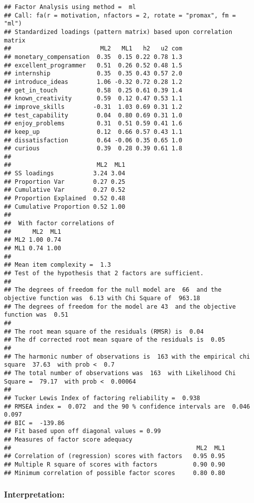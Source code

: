 \documentclass[
]{article}
\begin{document}
\begin{verbatim}
## Factor Analysis using method =  ml
## Call: fa(r = motivation, nfactors = 2, rotate = "promax", fm = "ml")
## Standardized loadings (pattern matrix) based upon correlation matrix
##                         ML2   ML1   h2   u2 com
## monetary_compensation  0.35  0.15 0.22 0.78 1.3
## excellent_programmer   0.51  0.26 0.52 0.48 1.5
## internship             0.35  0.35 0.43 0.57 2.0
## introduce_ideas        1.06 -0.32 0.72 0.28 1.2
## get_in_touch           0.58  0.25 0.61 0.39 1.4
## known_creativity       0.59  0.12 0.47 0.53 1.1
## improve_skills        -0.31  1.03 0.69 0.31 1.2
## test_capability        0.04  0.80 0.69 0.31 1.0
## enjoy_problems         0.31  0.51 0.59 0.41 1.6
## keep_up                0.12  0.66 0.57 0.43 1.1
## dissatisfaction        0.64 -0.06 0.35 0.65 1.0
## curious                0.39  0.28 0.39 0.61 1.8
## 
##                        ML2  ML1
## SS loadings           3.24 3.04
## Proportion Var        0.27 0.25
## Cumulative Var        0.27 0.52
## Proportion Explained  0.52 0.48
## Cumulative Proportion 0.52 1.00
## 
##  With factor correlations of 
##      ML2  ML1
## ML2 1.00 0.74
## ML1 0.74 1.00
## 
## Mean item complexity =  1.3
## Test of the hypothesis that 2 factors are sufficient.
## 
## The degrees of freedom for the null model are  66  and the objective function was  6.13 with Chi Square of  963.18
## The degrees of freedom for the model are 43  and the objective function was  0.51 
## 
## The root mean square of the residuals (RMSR) is  0.04 
## The df corrected root mean square of the residuals is  0.05 
## 
## The harmonic number of observations is  163 with the empirical chi square  37.63  with prob <  0.7 
## The total number of observations was  163  with Likelihood Chi Square =  79.17  with prob <  0.00064 
## 
## Tucker Lewis Index of factoring reliability =  0.938
## RMSEA index =  0.072  and the 90 % confidence intervals are  0.046 0.097
## BIC =  -139.86
## Fit based upon off diagonal values = 0.99
## Measures of factor score adequacy             
##                                                    ML2  ML1
## Correlation of (regression) scores with factors   0.95 0.95
## Multiple R square of scores with factors          0.90 0.90
## Minimum correlation of possible factor scores     0.80 0.80
\end{verbatim}

\hypertarget{interpretation-5}{%
\subsubsection{Interpretation:}\label{interpretation-5}}
\end{document}
